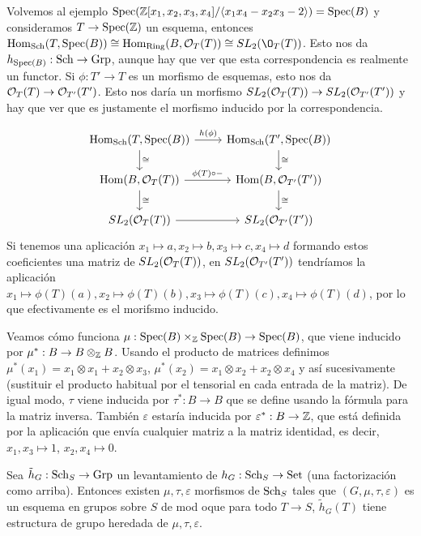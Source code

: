 \documentclass[GA.tex]{subfiles}
\begin{document}
\begin{ej}
Volvemos al ejemplo $\operatorname{Spec}(\mathbb{Z}[x_1,x_2,x_3,x_4]/\langle{x_1x_4-x_2x_3-2}\rangle)=\operatorname{Spec}(B)$ y consideramos $T\to\operatorname{Spec}(\mathbb{Z})$ un esquema, entonces $\Hom_{\Sch}(T, \spec(B))\cong \Hom_{\Ring}(B,\OO_T(T))\cong SL_2(\O_T(T))$. Esto nos da $h_{\operatorname{Spec}(B)}:\operatorname{Sch}\to\operatorname{Grp}$, aunque hay que ver que esta correspondencia es realmente un functor. Si $\phi:T'\to T$ es un morfismo de esquemas, esto nos da ${\mathcal O}_T(T)\to{\mathcal O}_{T'}(T')$. Esto nos daría un morfismo $SL_2({\mathcal O}_T(T))\to SL_2({\mathcal O}_{T'}(T'))$ y hay que ver que es justamente el morfismo inducido por la correspondencia.

\[
\begin{tikzcd}
\Hom_{\Sch}(T,\spec(B))\arrow[r, "h(\phi)"]\arrow[d, "\cong"] & \Hom_{\Sch}(T',\spec(B))\arrow[d, "\cong"]\\
\Hom(B,\OO_T(T))\arrow[r, "\phi(T)\circ-"]\arrow[d, "\cong"] & \Hom(B,\OO_{T'}(T'))\arrow[d,"\cong"]\\
SL_2(\OO_T(T))\arrow[r] & SL_2(\OO_{T'}(T'))
\end{tikzcd}
\]
Si tenemos una aplicación $x_1\mapsto a, x_2\mapsto b, x_3\mapsto c, x_4\mapsto d$ formando estos coeficientes una matriz de $SL_2({\mathcal O}_T(T))$, en $SL_2({\mathcal O}_{T'}(T'))$ tendríamos la aplicación $x_1\mapsto \phi(T)(a), x_2\mapsto\phi(T)(b),x_3\mapsto\phi(T)(c),x_4\mapsto\phi(T)(d)$, por lo que efectivamente es el morifsmo inducido. 


Veamos cómo funciona $\mu:\operatorname{Spec}(B)\times_{\mathbb{Z}}\operatorname{Spec}(B)\to\operatorname{Spec}(B)$, que viene inducido por $\mu^*:B\to B\otimes_{\mathbb{Z}} B$. Usando el producto de matrices definimos $\mu^*(x_1)=x_1\otimes x_1+x_2\otimes x_3$, $\mu^*(x_2)=x_1\otimes x_2+x_2\otimes x_4$ y así sucesivamente (sustituir el producto habitual por el tensorial en cada entrada de la matriz). De igual modo, $\tau$ viene inducida por $\tau^*:B\to B$ que se define usando la fórmula para la matriz inversa. También $\varepsilon$ estaría inducida por $\varepsilon^*:B\to \mathbb{Z}$, que está definida por la aplicación que envía cualquier matriz a la matriz identidad, es decir, $x_1,x_3\mapsto 1$, $x_2,x_4\mapsto 0$. 
\end{ej}



\begin{prop}
Sea $\tilde{h}_G:\operatorname{Sch}_S\to\operatorname{Grp}$ un levantamiento de $h_G:\operatorname{Sch}_S\to\operatorname{Set}$ (una factorización como arriba). Entonces existen $\mu,\tau,\varepsilon$ morfismos de $\operatorname{Sch}_S$ tales que $(G,\mu,\tau,\varepsilon)$ es un esquema en grupos sobre $S$ de mod oque para todo $T\to S$, $\tilde{h}_G(T)$ tiene estructura de grupo heredada de $\mu,\tau,\varepsilon$. 
\end{prop}
\end{document}
